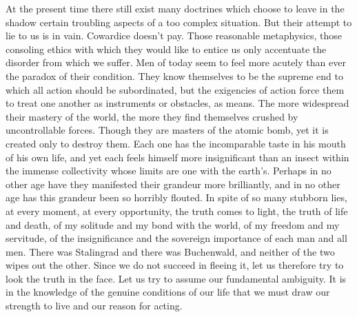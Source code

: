 \documentclass[11pt]{article}
\begin{document}
At the present time there still exist many doctrines which choose to leave in the shadow certain troubling aspects of a too complex situation. But their attempt to lie to us is in vain. Cowardice doesn’t pay. Those reasonable metaphysics, those consoling ethics with which they would like to entice us only accentuate the disorder from which we suffer. Men of today seem to feel more acutely than ever the paradox of their condition. They know themselves to be the supreme end to which all action should be subordinated, but the exigencies of action force them to treat one another as instruments or obstacles, as means. The more widespread their mastery of the world, the more they find themselves crushed by uncontrollable forces. Though they are masters of the atomic bomb, yet it is created only to destroy them. Each one has the incomparable taste in his mouth of his own life, and yet each feels himself more insignificant than an insect within the immense collectivity whose limits are one with the earth’s. Perhaps in no other age have they manifested their grandeur more brilliantly, and in no other age has this grandeur been so horribly flouted. In spite of so many stubborn lies, at every moment, at every opportunity, the truth comes to light, the truth of life and death, of my solitude and my bond with the world, of my freedom and my servitude, of the insignificance and the sovereign importance of each man and all men. There was Stalingrad and there was Buchenwald, and neither of the two wipes out the other. Since we do not succeed in fleeing it, let us therefore try to look the truth in the face. Let us try to assume our fundamental ambiguity. It is in the knowledge of the genuine conditions of our life that we must draw our strength to live and our reason for acting.
\end{document}
